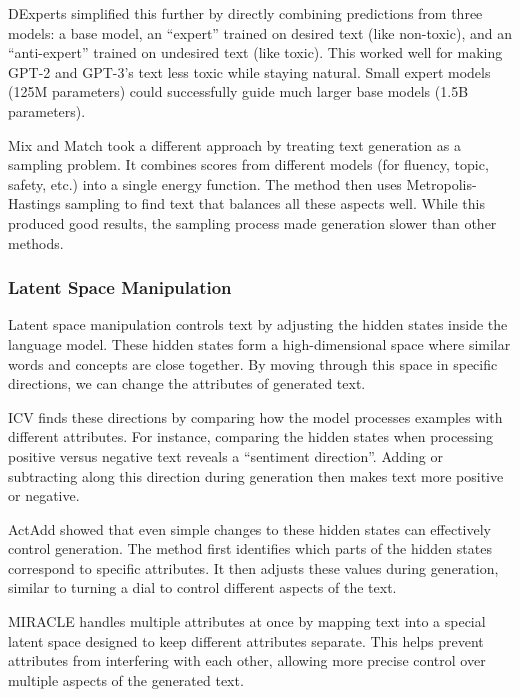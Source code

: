 DExperts \cite{liu-etal-2021-dexperts} simplified this further by directly combining predictions from three models: a base model, an ``expert'' trained on desired text (like non-toxic), and an ``anti-expert'' trained on undesired text (like toxic). This worked well for making GPT-2 and GPT-3's text less toxic while staying natural. Small expert models (125M parameters) could successfully guide much larger base models (1.5B parameters).

Mix and Match \cite{mireshghallah-etal-2022-mix} took a different approach by treating text generation as a sampling problem. It combines scores from different models (for fluency, topic, safety, etc.) into a single energy function. The method then uses Metropolis-Hastings sampling to find text that balances all these aspects well. While this produced good results, the sampling process made generation slower than other methods.

\subsubsection{Latent Space Manipulation}

Latent space manipulation controls text by adjusting the hidden states inside the language model. These hidden states form a high-dimensional space where similar words and concepts are close together. By moving through this space in specific directions, we can change the attributes of generated text.

ICV \cite{liu2024incontextvectorsmakingcontext} finds these directions by comparing how the model processes examples with different attributes. For instance, comparing the hidden states when processing positive versus negative text reveals a ``sentiment direction''. Adding or subtracting along this direction during generation then makes text more positive or negative.

ActAdd \cite{turner2024steeringlanguagemodelsactivation} showed that even simple changes to these hidden states can effectively control generation. The method first identifies which parts of the hidden states correspond to specific attributes. It then adjusts these values during generation, similar to turning a dial to control different aspects of the text.

MIRACLE \cite{lu-etal-2023-miracle} handles multiple attributes at once by mapping text into a special latent space designed to keep different attributes separate. This helps prevent attributes from interfering with each other, allowing more precise control over multiple aspects of the generated text.

